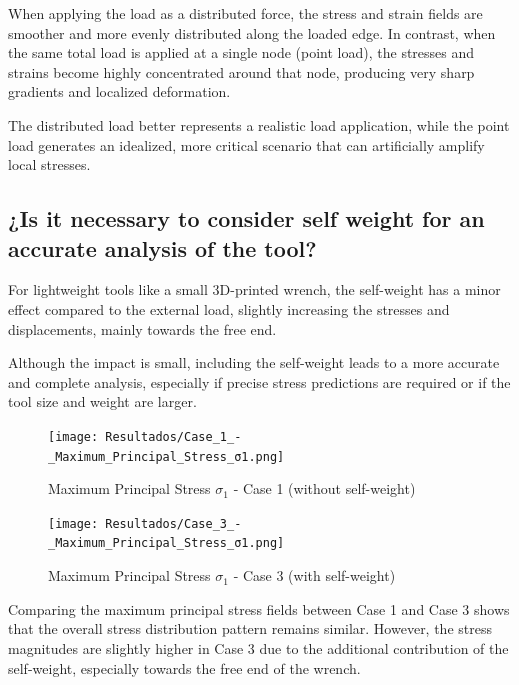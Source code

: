 \documentclass[12pt]{article}
\begin{document}
When applying the load as a distributed force, the stress and strain fields are smoother and more evenly distributed along the loaded edge.  
In contrast, when the same total load is applied at a single node (point load), the stresses and strains become highly concentrated around that node, producing very sharp gradients and localized deformation.

The distributed load better represents a realistic load application, while the point load generates an idealized, more critical scenario that can artificially amplify local stresses.

\subsection{¿Is it necessary to consider self weight for an accurate analysis of the tool?}

For lightweight tools like a small 3D-printed wrench, the self-weight has a minor effect compared to the external load, slightly increasing the stresses and displacements, mainly towards the free end.

Although the impact is small, including the self-weight leads to a more accurate and complete analysis, especially if precise stress predictions are required or if the tool size and weight are larger.

\begin{figure}[H]
    \centering
    \begin{minipage}{0.48\textwidth}
        \centering
        \texttt{[image: Resultados/Case\_1\_-\_Maximum\_Principal\_Stress\_σ1.png]}
        \caption{Maximum Principal Stress $\sigma_1$ - Case 1 (without self-weight)}
        \label{fig:stress_case1}
    \end{minipage}
    \hfill
    \begin{minipage}{0.48\textwidth}
        \centering
        \texttt{[image: Resultados/Case\_3\_-\_Maximum\_Principal\_Stress\_σ1.png]}
        \caption{Maximum Principal Stress $\sigma_1$ - Case 3 (with self-weight)}
        \label{fig:stress_case3}
    \end{minipage}
\end{figure}

Comparing the maximum principal stress fields between Case 1 and Case 3 shows that the overall stress distribution pattern remains similar.  
However, the stress magnitudes are slightly higher in Case 3 due to the additional contribution of the self-weight, especially towards the free end of the wrench.
\end{document}
